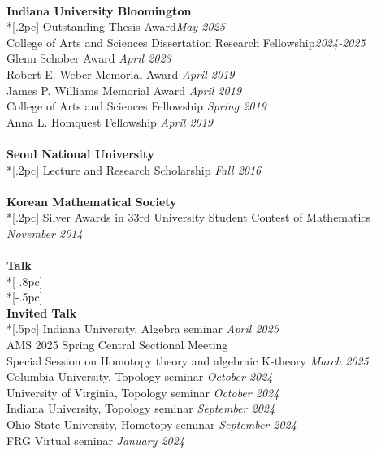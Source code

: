 \documentclass{article}
\begin{document}
\\
{\bf \large Indiana University Bloomington} \\*[.2pc]
{Outstanding Thesis Award}\hfill {\it May 2025\/} \\
{College of Arts and Sciences Dissertation Research Fellowship}\hfill {\it 2024-2025\/} \\
{ Glenn Schober Award} \hfill {\it April 2023\/} \\
{ Robert E. Weber Memorial Award} \hfill {\it April 2019\/} \\
{  James P. Williams Memorial Award} \hfill {\it April 2019\/} \\
{ College of Arts and Sciences Fellowship} \hfill {\it Spring 2019\/} \\
{ Anna L. Homquest Fellowship} \hfill {\it April 2019\/} \\
\\
{\bf \large Seoul National University} \\*[.2pc]
{Lecture and Research Scholarship} \hfill {\it Fall 2016\/} \\
\\
{\bf \large Korean Mathematical Society} \\*[.2pc]
Silver Awards in 33rd University Student Contest of Mathematics \hfill {\it November 2014\/}  \\
\\
{\Large \bf Talk} \\*[-.8pc]
\underline{\hspace{6.5in}} \\*[-.5pc]
\\
{\bf  \large Invited Talk} \\*[.5pc]
{ Indiana University, Algebra seminar} \hfill {\it April 2025\/}  \\
{  AMS 2025 Spring Central Sectional Meeting \\ \hspace*{1em} Special Session on Homotopy theory and algebraic K-theory} \hfill {\it March 2025\/}  \\
{  Columbia University, Topology seminar} \hfill {\it October 2024\/}  \\
{  University of Virginia, Topology seminar} \hfill {\it October 2024\/}  \\
{ Indiana University, Topology seminar} \hfill {\it September 2024\/}  \\
{ Ohio State University, Homotopy seminar} \hfill {\it September 2024\/}  \\
{ FRG Virtual seminar} \hfill {\it January 2024\/}  \\
\end{document}
